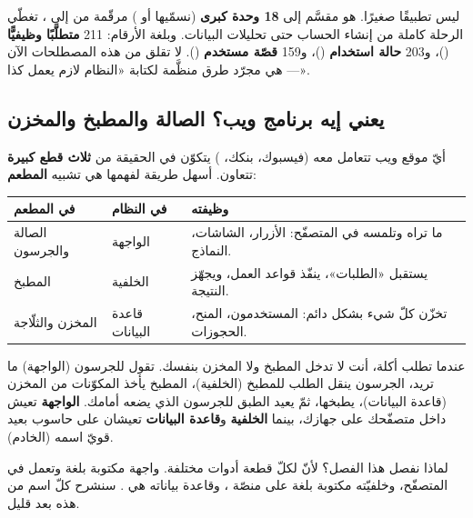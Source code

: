 \begin{keyp}
 ليس تطبيقًا صغيرًا. هو مقسَّم إلى \textbf{18 وحدة كبرى} (نسمّيها
 أو ) مرقّمة من  إلى ، تغطّي الرحلة كاملة
من إنشاء الحساب حتى تحليلات البيانات. وبلغة الأرقام: 211 \textbf{متطلَّبًا وظيفيًّا}
()، و203 \textbf{حالة استخدام} ()،
و159 \textbf{قصّة مستخدم} (). لا تقلق من هذه المصطلحات الآن — هي مجرّد
طرق منظَّمة لكتابة «النظام لازم يعمل كذا».
\end{keyp}

\subsection{يعني إيه برنامج ويب؟ الصالة والمطبخ والمخزن}

أيّ موقع ويب تتعامل معه (فيسبوك، بنكك، ) يتكوّن في الحقيقة من
\textbf{ثلاث قطع كبيرة} تتعاون. أسهل طريقة لفهمها هي تشبيه \textbf{المطعم}:

\begin{center}
\begin{tabular}{L{3.4cm} L{4.3cm} L{4.6cm}}
\toprule
\textbf{\color{spPrimary}في المطعم} & \textbf{\color{spPrimary}في النظام} & \textbf{\color{spPrimary}وظيفته} \\
\midrule
الصالة والجرسون & الواجهة  & ما تراه وتلمسه في المتصفّح: الأزرار، الشاشات، النماذج. \\
المطبخ & الخلفية  & يستقبل «الطلبات»، ينفّذ قواعد العمل، ويجهّز النتيجة. \\
المخزن والثلّاجة & قاعدة البيانات  & تخزّن كلّ شيء بشكل دائم: المستخدمون، المنح، الحجوزات. \\
\bottomrule
\end{tabular}
\end{center}

\begin{idea}
عندما تطلب أكلة، أنت لا تدخل المطبخ ولا المخزن بنفسك. تقول للجرسون (الواجهة) ما تريد،
الجرسون ينقل الطلب للمطبخ (الخلفية)، المطبخ يأخذ المكوّنات من المخزن (قاعدة البيانات)،
يطبخها، ثمّ يعيد الطبق للجرسون الذي يضعه أمامك. \textbf{الواجهة} تعيش داخل متصفّحك على
جهازك، بينما \textbf{الخلفية} و\textbf{قاعدة البيانات} تعيشان على حاسوب بعيد قويّ اسمه
 (الخادم).
\end{idea}

\begin{note}
لماذا نفصل هذا الفصل؟ لأنّ لكلّ قطعة أدوات مختلفة. واجهة  مكتوبة بلغة
 وتعمل في المتصفّح، وخلفيّته مكتوبة بلغة  على منصّة ،
وقاعدة بياناته هي . سنشرح كلّ اسم من هذه بعد قليل.
\end{note}


